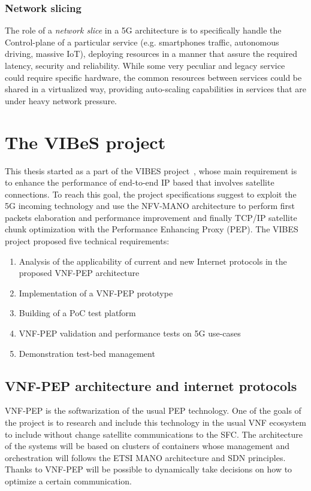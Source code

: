 \subsubsection{Network slicing}
\label{chap:background:sec:5g:sub:ns}
The role of a \emph{network slice} in a 5G architecture is to specifically
handle the Control-plane of a particular service (e.g. smartphones traffic,
autonomous driving, massive IoT), deploying resources in a manner that assure
the required latency, security and reliability. While some very peculiar and
legacy service could require specific hardware, the common resources between
services could be shared in a virtualized way, providing auto-scaling
capabilities in services that are under heavy network pressure.

\section{The VIBeS project}

This thesis started as a part of the VIBES project~\cite{vibesesa}, whose main
requirement is to enhance the performance of end-to-end IP based that involves
satellite connections. To reach this goal, the project specifications suggest to
exploit the 5G incoming technology and use the NFV-MANO architecture to perform
first packets elaboration and performance improvement and finally TCP/IP
satellite chunk optimization with the Performance Enhancing Proxy (PEP). The
VIBES project proposed five technical requirements:
\begin{enumerate}
  \item Analysis of the applicability of current and new Internet protocols in
  the proposed VNF-PEP architecture
  \item Implementation of a VNF-PEP prototype
  \item Building of a PoC test platform
  \item VNF-PEP validation and performance tests on 5G use-cases
  \item Demonstration test-bed management
\end{enumerate}

\subsection{VNF-PEP architecture and internet protocols}
VNF-PEP is the softwarization of the usual PEP technology. One of the goals of
the project is to research and include this technology in the usual VNF
ecosystem to include without change satellite communications to the SFC. The
architecture of the systems will be based on clusters of containers whose
management and orchestration will follows the ETSI MANO architecture and SDN
principles. Thanks to VNF-PEP will be possible to dynamically take decisions on
how to optimize a certain communication.

